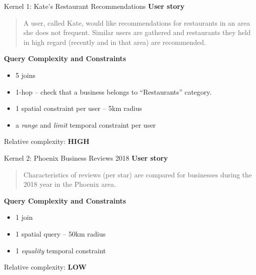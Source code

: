 \begin{frame}{Kernel 1: Kate's Restaurant Recommendations}
    \textbf{User story}
    \begin{quote}
        A user, called Kate, would like recommendations for restaurants in an area she does not frequent. Similar users are gathered and restaurants they held in high regard (recently and in that area) are recommended.
    \end{quote}
    \textbf{Query Complexity and Constraints}
    \begin{itemize}
        \item 5 joins
        \item 1-hop -- check that a business belongs to ``Restaurants'' category.
        \item 1 spatial constraint per user -- 5km radius
        \item a \emph{range} and \emph{limit} temporal constraint per user
    \end{itemize}
    
    \medskip
    
    Relative complexity: \textbf{HIGH}
\end{frame}

\begin{frame}{Kernel 2: Phoenix Business Reviews 2018}
    \textbf{User story}
    \begin{quote}
        Characteristics of reviews (per star) are compared for businesses during the 2018 year in the Phoenix area.
    \end{quote}
    \textbf{Query Complexity and Constraints}
    \begin{itemize}
        \item 1 join
        \item 1 spatial query -- 50km radius
        \item 1 \emph{equality} temporal constraint
    \end{itemize}
    
    \medskip
    
    Relative complexity: \textbf{LOW}
\end{frame}

